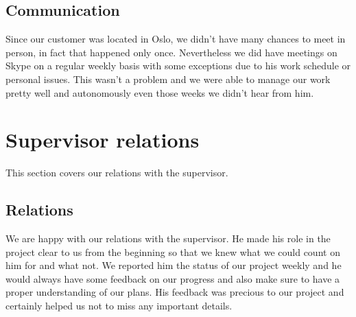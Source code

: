
\subsection{Communication}
Since our customer was located in Oslo, we didn't have many chances to meet in person,
in fact that happened only once. Nevertheless we did have meetings on Skype on a regular weekly basis
with some exceptions due to his work schedule or personal issues.
This wasn't a problem and we were able to manage our work pretty well and autonomously
even those weeks we didn't hear from him.


\section{Supervisor relations}
This section covers our relations with the supervisor.

\subsection{Relations}
We are happy with our relations with the supervisor.
He made his role in the project clear to us from the beginning so that we knew
what we could count on him for and what not.
We reported him the status of our project weekly and he would always have some feedback
on our progress and also make sure to have a proper understanding of our plans.
His feedback was precious to our project and certainly helped us not to miss any important details.


